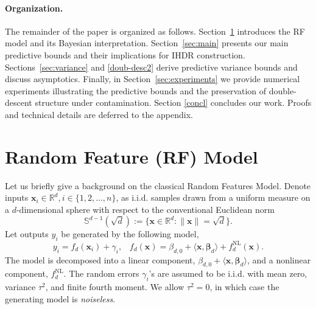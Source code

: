 \documentclass[12pt, english, oneside, a4paper]{article}
\newcommand{\R}{\mathbb{R}}
\renewcommand{\S}{\mathbb{S}}
\newcommand{\x}{\boldsymbol{x}}
\newcommand{\bb}{\boldsymbol{\beta}}
\begin{document}
\paragraph{Organization.}
The remainder of the paper is organized as follows. Section~\ref{sec:setup} introduces the RF model and its Bayesian interpretation. Section~\ref{sec:main} presents our main predictive bounds and their implications for IHDR construction. Sections~\ref{sec:variance} and \ref{doub-desc2} derive predictive variance bounds and discuss asymptotics. Finally, in Section~\ref{sec:experiments} we provide numerical experiments illustrating the predictive bounds and the preservation of double-descent structure under contamination. Section \ref{concl} concludes our work. Proofs and technical details are deferred to the appendix. 





\section{Random Feature (RF) Model}\label{sec:setup}
Let us briefly give a background on the classical Random Features Model. 
Denote inputs $\x_i\in\R^d,  i \in \{1,2,\ldots,n\}$, as i.i.d. samples drawn from a uniform measure on a $ d$-dimensional sphere with respect to the conventional Euclidean norm
\begin{equation*}
    \S^{d-1}(\sqrt{d}) := \{\x\in\R^{d}:\|\x\| = \sqrt{d}\}.
\end{equation*}
Let outputs $y_i$ be generated by the following model,
\begin{equation*}
    y_i = f_d(\x_i) + \gamma_i \text{,} \quad f_d(\x) = \beta_{d,0} + \langle\x,\bb_d\rangle + f_{d}^\text{NL}(\x).
\end{equation*}
The model is decomposed into a linear component, $\beta_{d,0} + \langle\x,\bb_d\rangle$, and a nonlinear component, $f_d^\text{NL}$. The random errors $\gamma_i$'s are assumed to be i.i.d. with mean zero, variance $\tau^2$, and finite fourth moment. We allow $\tau^2=0$, in which case the generating model is \emph{noiseless}.
\end{document}
